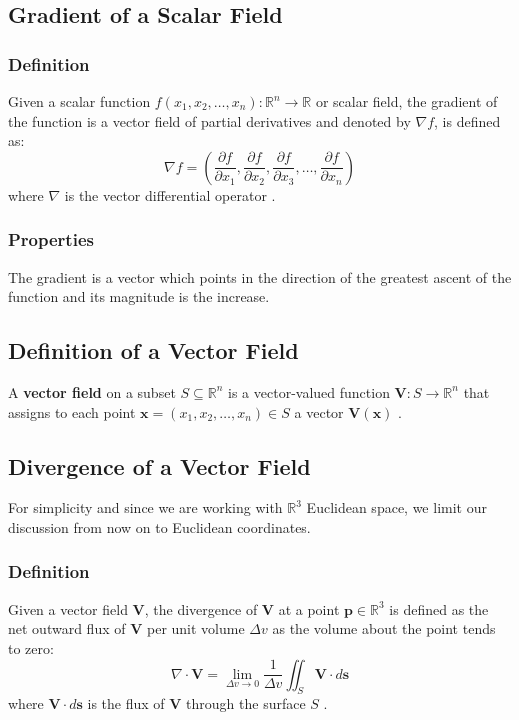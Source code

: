 \subsection{Gradient of a Scalar Field}
\subsubsection{Definition}
Given a scalar function \( f(x_1, x_2, \ldots, x_n): \mathbb{R}^n \to \mathbb{R} 
\) or scalar field, the gradient of the function is a vector field of partial 
derivatives and denoted by \( \nabla f \), is defined as:
\begin{equation}
\nabla f = \left( \frac{\partial f}{\partial x_1}, \frac{\partial f}{\partial 
x_2}, \frac{\partial f}{\partial x_3}, \ldots, \frac{\partial f}{\partial x_n} 
\right)
\label{eq:gradient}
\end{equation}
where \( \nabla \) is the vector differential operator \cite{math-book}.

\subsubsection{Properties}
The gradient is a vector which points in the direction of the greatest ascent of 
the function and its magnitude is the increase.

\subsection{Definition of a Vector Field}
A \textbf{vector field} on a subset \(S \subseteq \mathbb{R}^n\) is a 
vector-valued function \(\mathbf{V}: S \to \mathbb{R}^n\) that assigns to each 
point \(\mathbf{x} = (x_1, x_2, \ldots, x_n) \in S\) a vector 
\(\mathbf{V}(\mathbf{x})\) \cite{math-book}.

\subsection{Divergence of a Vector Field}
For simplicity and since we are working with \(\mathbb{R}^3\) Euclidean space, we 
limit our discussion from now on to Euclidean coordinates.

\subsubsection{Definition}
Given a vector field \(\mathbf{V}\), the divergence of \(\mathbf{V}\) at a point 
\( \mathbf{p} \in \mathbb{R}^3 \) is defined as the net outward flux of 
\(\mathbf{V}\) per unit volume \(\Delta v\) as the volume about the point tends 
to zero:
\begin{equation}
\nabla \cdot \mathbf{V} = \lim_{\Delta v \to 0} \frac{1}{\Delta v} \iint_S 
\mathbf{V} \cdot d\mathbf{s}
\label{eq:divergence}
\end{equation}
where \( \mathbf{V} \cdot d\mathbf{s} \) is the flux of \( \mathbf{V} \) through 
the surface \(S\) \cite{book-magnetism}.

